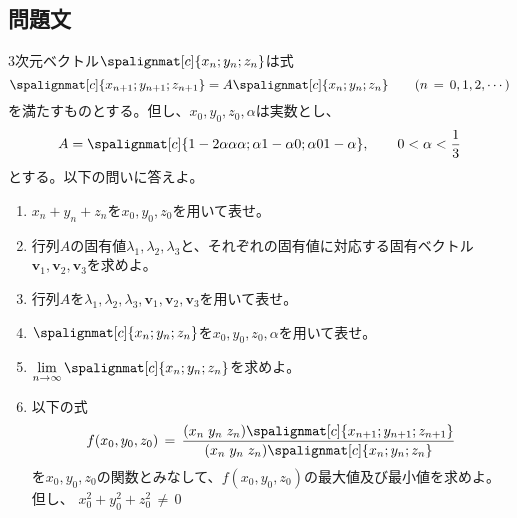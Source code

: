 \subsection{問題文}
3次元ベクトル$\spalignmat[c]{
    {x_n};
    {y_n};
    {z_n}
}$は式
\begin{equation*}
    \spalignmat[c]{
        {x_{n + 1}};
        {y_{n + 1}};
        {z_{n + 1}}
    }
    = 
    A \spalignmat[c]{
        {x_n};
        {y_n};
        {z_n}
    }\qquad (n \, = \, 0, 1, 2, \cdots)
\end{equation*}
を満たすものとする。但し、$x_0, y_0, z_0, \alpha$は実数とし、
\begin{equation*}
    A = \spalignmat[c]{
        {1 - 2\alpha} {\alpha} {\alpha};
        {\alpha} {1 - \alpha} {0};
        {\alpha} {0} {1 - \alpha}
    }, \qquad 0 < \alpha < \frac{1}{3}
\end{equation*}
とする。以下の問いに答えよ。
\begin{enumerate}[(1)]
  \item $x_n + y_n + z_n$を$x_0, y_0, z_0$を用いて表せ。
  \item 行列$A$の固有値$\lambda_1, \lambda_2, \lambda_3$と、それぞれの固有値に対応する固有ベクトル
        $\mathbold{v}_1, \mathbold{v}_2, \mathbold{v}_3$を求めよ。
  \item 行列$A$を$\lambda_1, \lambda_2, \lambda_3, \mathbold{v}_1, \mathbold{v}_2, \mathbold{v}_3$を用いて表せ。
  \item $\spalignmat[c]{
    {x_n};
    {y_n};
    {z_n}
  }$を$x_0, y_0, z_0, \alpha$を用いて表せ。
  \item $\lim\limits_{n \to \infty} \spalignmat[c]{
      {x_n};
      {y_n};
      {z_n}
  }$を求めよ。
  \item 以下の式
  \begin{equation*}
	  f(x_0, y_0, z_0)\, = \, \frac{
		  (x_n\;y_n\; z_n)
	  \spalignmat[c]{
		  {x_{n + 1}};
		  {y_{n + 1}};
		  {z_{n + 1}}
	  }}{(x_n\;y_n\; z_n)\spalignmat[c]{
		  {x_n};
		  {y_n};
		  {z_n}
	  }}
  \end{equation*}
  を$x_0, y_0, z_0$の関数とみなして、$f(x_0, y_0, z_0)$の最大値及び最小値を求めよ。但し、
  $x_0^{2} + y_0^{2} + z_0^{2}\, \neq \, 0$
\end{enumerate}
\newpage
